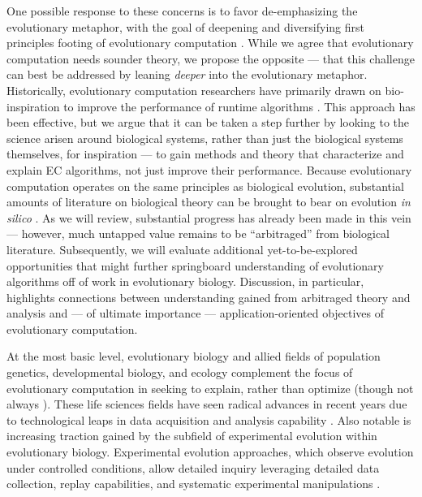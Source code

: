 One possible response to these concerns is to favor de-emphasizing the evolutionary metaphor, with the goal of deepening and diversifying first principles footing of evolutionary computation \citep{moore2023evolution}.
While we agree that evolutionary computation needs sounder theory, we propose the opposite --- that this challenge can best be addressed by leaning \textit{deeper} into the evolutionary metaphor.
Historically, evolutionary computation researchers have primarily drawn on bio-inspiration to improve the performance of runtime algorithms \citep{banzhaf2006artificial,kumar2003biologically,mcphee2009developmental}.
This approach has been effective, but we argue that it can be taken a step further by looking to the science arisen around biological systems, rather than just the biological systems themselves, for inspiration --- to gain methods and theory that characterize and explain EC algorithms, not just improve their performance.
Because evolutionary computation operates on the same principles as biological evolution, substantial amounts of literature on biological theory can be brought to bear on evolution \textit{in silico} \citep{belew1996computation}.
As we will review, substantial progress has already been made in this vein --- however, much untapped value remains to be ``arbitraged'' from biological literature.
Subsequently, we will evaluate additional yet-to-be-explored opportunities that might further springboard understanding of evolutionary algorithms off of work in evolutionary biology.
Discussion, in particular, highlights connections between understanding gained from arbitraged theory and analysis and --- of ultimate importance --- application-oriented objectives of evolutionary computation.

At the most basic level, evolutionary biology and allied fields of population genetics, developmental biology, and ecology complement the focus of evolutionary computation in seeking to explain, rather than optimize (though not always \citep{cobb2013directed,carroll2014applying}).
These life sciences fields have seen radical advances in recent years due to technological leaps in data acquisition and analysis capability \citep{math2018omics,deshpande2024evolution}.
Also notable is increasing traction gained by the subfield of experimental evolution within evolutionary biology.
Experimental evolution approaches, which observe evolution under controlled conditions, allow detailed inquiry leveraging detailed data collection, replay capabilities, and systematic experimental manipulations \citep{kawecki2012experimental}.


